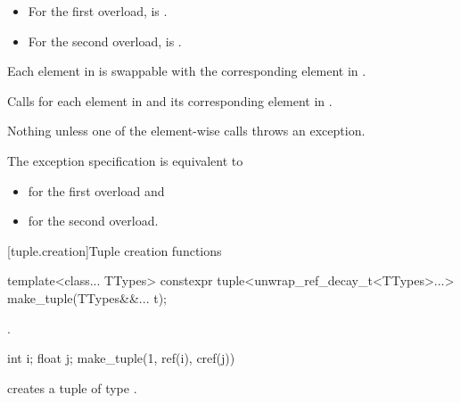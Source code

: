 \documentclass{wg21}
\begin{document}
\begin{itemdescr}
    \pnum
    \mandates
    \begin{itemize}
        \item
        For the first overload,
         is .
        \item
        For the second overload,
         is .
    \end{itemize}

    \pnum
    \expects
    Each element in  is swappable with
    the corresponding element in .

    \pnum
    \effects
    Calls  for each element in  and its
    corresponding element in .

    \pnum
    \throws
    Nothing unless one of the element-wise  calls throws an exception.

    \pnum
    \remarks
    The exception specification is equivalent to
    \begin{itemize}
        \item
         for the first overload and
        \item
         for the second overload.
    \end{itemize}
\end{itemdescr}

[tuple.creation]{Tuple creation functions}

%
%
\begin{itemdecl}
    template<class... TTypes>
    constexpr tuple<unwrap_ref_decay_t<TTypes>...> make_tuple(TTypes&&... t);
\end{itemdecl}

\begin{itemdescr}
    \pnum
    \returns
    .

    \pnum
    \begin{example}
        \begin{codeblock}
            int i; float j;
            make_tuple(1, ref(i), cref(j))
        \end{codeblock}
        creates a tuple of type .
    \end{example}
\end{itemdescr}
\end{document}
